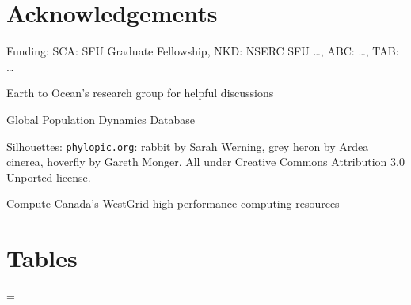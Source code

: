 \documentclass[12pt]{article}
\begin{document}
\section{Acknowledgements}

Funding: SCA: SFU Graduate Fellowship, NKD: NSERC SFU \ldots, ABC: \ldots, TAB: \ldots

Earth to Ocean's research group for helpful discussions

Global Population Dynamics Database

Silhouettes: \texttt{phylopic.org}: rabbit by Sarah Werning, grey heron by Ardea cinerea, hoverfly by Gareth Monger. All under Creative Commons Attribution 3.0 Unported license.

Compute Canada's WestGrid high-performance computing resources



\clearpage

\section{Tables}

\LTcapwidth=\textwidth
{}
\end{document}
